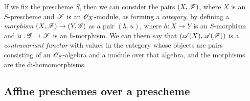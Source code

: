 \begin{env}[1.1.3]
\label{2.1.1.3}
If we fix the prescheme $S$, then we can consider the pairs $(X,\mathscr{F})$, where $X$ is an $S$-prescheme and $\mathscr{F}$ is an $\mathscr{O}_X$-module, as forming a \emph{category}, by defining a \emph{morphism} $(X,\sh{F})\to(Y,\sh{G})$ as a pair $(h,u)$, where $h:X\to Y$ is an $S$-morphism and $u:\sh{G}\to\sh{F}$ is an $h$-morphism.
We can theen say that $(\mathscr{A}(X),\mathscr{A}(\mathscr{F}))$ is a \emph{contravariant functor} with values in the category whose objects are pairs consisting of an $\mathscr{O}_S$-algebra and a module over that algebra, and the morphisms are the di-homomorphisms.
\end{env}

\subsection{Affine preschemes over a prescheme}
\label{subsection:affine-preschemes-over-a-prescheme}

